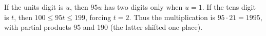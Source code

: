 If the units digit is $u$, then $95u$ has two digits only when $u=1$. If the tens digit is $t$, then $100\le95t\le199$, forcing $t=2$. Thus the multiplication is $\boxed{95\cdot21=1995}$, with partial products 95 and 190 (the latter shifted one place).
